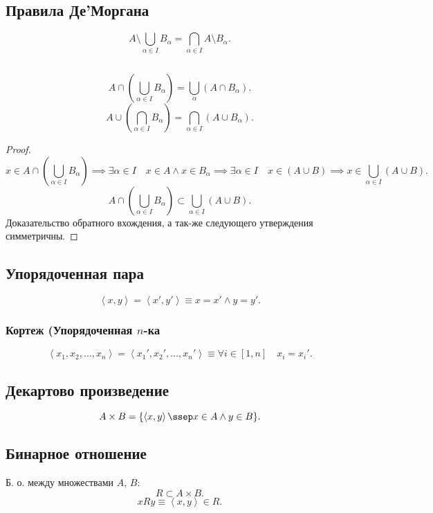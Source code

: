 \documentclass[11pt, oneside]{article}   	%
\begin{document}
    \subsection{Правила Де'Моргана}
        \[ A\setminus\bigcup\limits_{\alpha \in I}B_{\alpha} = \bigcap\limits_{\alpha \in I}A\setminus B_{\alpha}  .\]
    \subsection{}
        \begin{theorem}
            \[ A\cap\left( \bigcup\limits_{\alpha \in I}B_{\alpha} \right)=\bigcup\limits_{\alpha}\left( A\cap B_{\alpha} \right)   .\] 
            \[ A\cup\left( \bigcap\limits_{\alpha \in I}B_{\alpha} \right) = \bigcap\limits_{\alpha \in I}\left( A\cup B_{\alpha} \right)   .\] 
            \begin{proof}
                \[x \in A\cap\left( \bigcup\limits_{\alpha \in I}B_{\alpha} \right) \implies \exists{\alpha \in I}\quad x \in A\land x \in B_{\alpha} \implies \exists{\alpha \in I}\quad x \in \left( A\cup B \right) \implies x \in \bigcup\limits_{\alpha \in I}\left( A\cup B \right) .\]
                \[ A\cap\left( \bigcup\limits_{\alpha \in I}B_{\alpha} \right) \subset \bigcup\limits_{\alpha \in I}\left( A\cup B \right) .\] 
                Доказательство обратного вхождения, а так-же следующего утверждения симметричны. 
            \end{proof}
        \end{theorem}
    \subsection{Упорядоченная пара}
        \[ \left<x, y\right> = \left<x', y'\right> \equiv x=x'\land y=y' .\]
        \subsubsection{Кортеж (Упорядоченная $n$-ка}
        \[ \left<x_1, x_2, \ldots, x_n\right> = \left<x_1', x_2', \ldots, x_n'\right> \equiv \forall{i \in [1, n]}\quad x_i = x_i' .\] 
    \subsection{Декартово произведение}
        \[ A\times B = \{\left<x, y\right> \ssep x \in A\land y \in B\}  .\] 
    \subsection{Бинарное отношение}
        Б. о. между множествами $A$,  $B$:
         \[ R \subset A\times B .\]
         \[ xRy \equiv \left<x, y\right> \in R .\]
\end{document}
